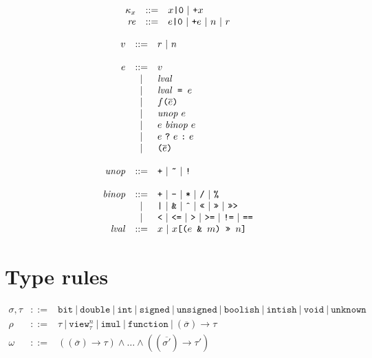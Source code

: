 \documentclass{article}
\newcommand{\ternary}[3]{{#1}\ \mathjs{?}\ {#2}\ \mathjs{:}\ {#3}}
\newcommand{\funcall}[2]{{#1}\mathjs{(}{#2}\mathjs{)}}
\newcommand{\paren}[1]{\mathjs{(}{#1}\mathjs{)}}
\newcommand{\funty}[2]{({#1}) \rightarrow {#2}}
\newcommand{\seq}[1]{\overline{{#1}}}
\newcommand{\mathjs}[1]{\mbox{\texttt{{#1}}}}
\newcommand{\bit}{\mathtt{bit}}
\newcommand{\unsigned}{\mathtt{unsigned}}
\newcommand{\signed}{\mathtt{signed}}
\newcommand{\double}{\mathtt{double}}
\newcommand{\view}[2]{\mathtt{view}^{#1}_{#2}}
\newcommand{\unk}{\mathtt{unknown}}
\newcommand{\void}{\mathtt{void}}
\newcommand{\getprop}[2]{{#1}\mathjs{[}{#2}\mathjs{]}}
\newcommand{\todouble}[1]{\mathjs{+}{#1}}
\renewcommand{\int}{\mathtt{int}}
\newcommand{\function}{\mathtt{function}}
\newcommand{\boolish}{\mathtt{boolish}}
\newcommand{\imul}{\mathtt{imul}}
\newcommand{\intish}{\mathtt{intish}}
\begin{document}
\[
\begin{array}{rcl}
\kappa_x & ::= & x\mathjs{|0} ~|~ \todouble{x} \\
\mathit{re} & ::= & e\mathjs{|0} ~|~ \todouble{e} ~|~ n ~|~ r \\
\end{array}
\]

\[
\begin{array}{rcl}
v & ::= & r ~|~ n \\
\\
e & ::= & v \\
  &  |  & \mathit{lval} \\
  &  |  & \mathit{lval}\mathjs{ = }e \\
  &  |  & \funcall{f}{\seq{e}} \\
  &  |  & \mathit{unop}\ e \\
  &  |  & e\ \mathit{binop}\ e \\
  &  |  & \ternary{e}{e}{e} \\
  &  |  & \paren{\seq{e}} \\
\\
\mathit{unop} & ::= & \mathjs{+} ~|~ \mathjs{\~{}} ~|~ \mathjs{!} \\
\\
\mathit{binop} & ::= & \mathjs{+} ~|~ \mathjs{-} ~|~ \mathjs{*} ~|~ \mathjs{/} ~|~ \mathjs{\%} \\
               &  |  & \mathjs{|} ~|~ \mathjs{\&} ~|~ \mathjs{\^{}} ~|~ \mathjs{<<} ~|~ \mathjs{>>} ~|~ \mathjs{>>>} \\
               &  |  & \mathjs{<} ~|~ \mathjs{<=} ~|~ \mathjs{>} ~|~ \mathjs{>=} ~|~ \mathjs{!=} ~|~ \mathjs{==} \\
\mathit{lval} & ::= & x ~|~ \getprop{x}{\paren{e\mathjs{ \& }m}\mathjs{ >> }n} \\
\end{array}
\]

\section{Type rules}

\[
\begin{array}{rcl}
\sigma, \tau & ::= & \bit ~|~ \double ~|~ \int ~|~ \signed ~|~ \unsigned ~|~ \boolish ~|~ \intish ~|~ \void ~|~ \unk \\
\rho & ::= & \tau ~|~ \view{n}{\tau} ~|~ \imul ~|~ \function ~|~ \funty{\seq{\sigma}}{\tau} \\
\omega & ::= & (\funty{\seq{\sigma}}{\tau}) \land \ldots \land (\funty{\seq{\sigma'}}{\tau'}) \\
\end{array}
\]
\end{document}
